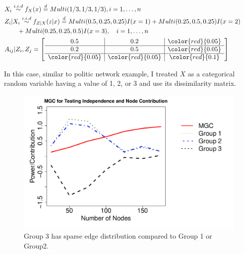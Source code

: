 \documentclass[12pt]{article}
\begin{document}
\begin{equation}
\label{eq:Three}
\begin{gathered}
\begin{aligned}
&  X_{i} \overset{i.i.d}{\sim} f_{X}(x)   \stackrel{d}{=}  Multi(1/3, 1/3, 1/3), i = 1, \ldots , n \\ 
&  Z_{i} | X_{i}  \overset{i.i.d}{\sim}    f_{Z|X}(z|x)  \stackrel{d}{=}   Multi(0.5, 0.25, 0.25) I( x = 1 ) +   Multi(0.25, 0.5, 0.25) I (x = 2)  \qquad  \\ & \quad \quad + Multi(0.25, 0.25, 0.5)I(x = 3), \quad  i = 1,\ldots,n  \\
&  A_{ij} | Z_{i}, Z_{j}   = \left[ \begin{array}{c|c|c} 0.5 & 0.2 & \color{red}{0.05} \\ \hline 0.2 & 0.5 & \color{red}{0.05} \\ \hline \color{red}{0.05} & \color{red}{0.05} & \color{red}{0.1}   \end{array} \right]
\end{aligned}
\end{gathered}
\end{equation}

In this case, similar to politic network example, I treated $X$ as a categorical random variable having a value of 1, 2, or 3 and use its dissimilarity matrix.

\begin{figure}[h]
	\centering
	\includegraphics[width=\linewidth]{../Figure/negcontri.pdf}	
	\caption{Group 3 has sparse edge distribution compared to Group 1 or Group2.}
	\label{fig:negcontri}
\end{figure}

\newpage
\end{document}
